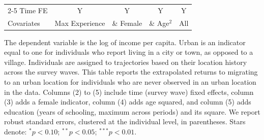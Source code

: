 \begin{table}[htbp]
\begin{threeparttable}
\begin{tabular}{l cccc}
\cmidrule{2-5} Time FE & Y & Y & Y & Y \\ Covariates & Max Experience & \& Female & \& Age$^2$ & All \\ \bottomrule \end{tabular} \begin{tablenotes}[flushleft] \footnotesize \item{The dependent variable is the log of income per capita. Urban is an indicator equal to one for individuals who report living in a city or town, as opposed to a village. Individuals are assigned to trajectories based on their location history across the survey waves. This table reports the extrapolated returns to migrating to an urban location for individuals who are never observed in an urban location in the data. Columns (2) to (5) include time (survey wave) fixed effects, column (3) adds a female indicator, column (4) adds age squared, and column (5) adds education (years of schooling, maximum across periods) and its square. We report robust standard errors, clustered at the individual level, in parentheses. Stars denote: $^{*} p<0.10$; $^{**} p<0.05$; $^{***} p<0.01$.} \end{tablenotes} \end{threeparttable} \end{table}
